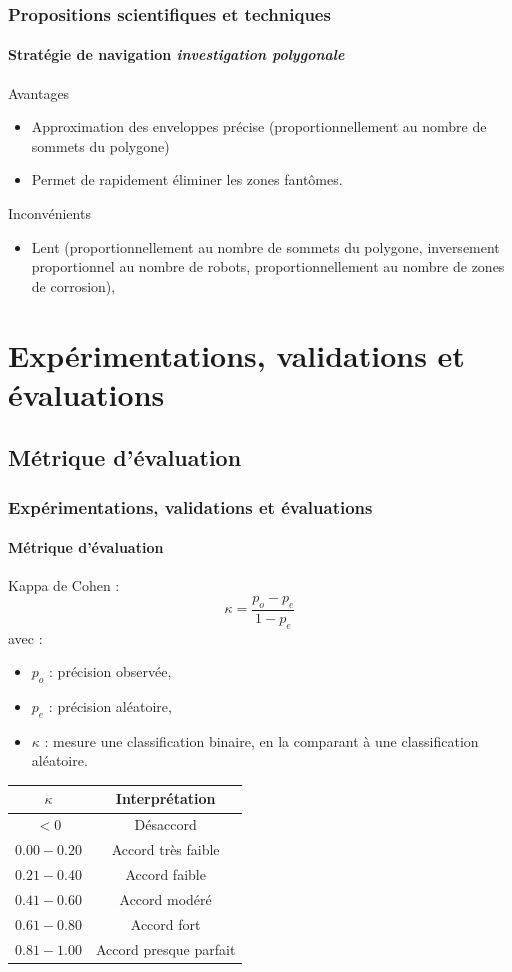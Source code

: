 \documentclass{beamer}
\begin{document}
			\begin{frame}
				\frametitle{Propositions scientifiques et techniques}
				\framesubtitle{Stratégie de navigation \textit{investigation polygonale}}
				\begin{exampleblock}{Avantages}
					\begin{itemize}
						\item Approximation des enveloppes précise (proportionnellement au nombre de sommets du polygone)
						\item Permet de rapidement éliminer les zones fantômes.
					\end{itemize}
				\end{exampleblock}
				\begin{alertblock}{Inconvénients}
					\begin{itemize}
						\item Lent (proportionnellement au nombre de sommets du polygone, inversement proportionnel au nombre de robots, proportionnellement au nombre de zones de corrosion),
					\end{itemize}
				\end{alertblock}
			\end{frame}
	\section{Expérimentations, validations et évaluations}
		\subsection{Métrique d'évaluation}
			\begin{frame}
				\frametitle{Expérimentations, validations et évaluations}
				\framesubtitle{Métrique d'évaluation}
				Kappa de Cohen :
				\begin{equation*}
					\kappa = \frac{p_o - p_e}{1 - p_e}
				\end{equation*}
				avec :
				\begin{itemize}
					\item $p_o$ : précision observée,
					\item $p_e$ : précision aléatoire,
					\item $\kappa$ : mesure une classification binaire, en la comparant à une classification aléatoire.
				\end{itemize}
				\begin{table}
					\centering
					\begin{tabular}{|c|c|}
						\hline
						$\kappa$ & Interprétation \\
						\hline
						$< 0$ & Désaccord \\
						\hline
						$0.00 - 0.20$ & Accord très faible \\
						\hline
						$0.21 - 0.40$ & Accord faible \\
						\hline
						$0.41 - 0.60$ & Accord modéré \\
						\hline
						$0.61 - 0.80$ & Accord fort \\
						\hline
						$0.81 - 1.00$ & Accord presque parfait \\
						\hline
					\end{tabular}
				\end{table}
			\end{frame}
\end{document}
